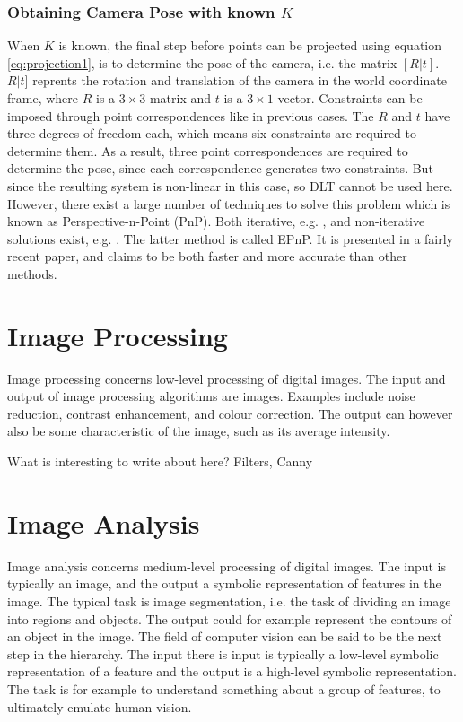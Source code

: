 \subsubsection{Obtaining Camera Pose with known $K$} \label{camera-pose}
When $K$ is known, the final step before points can be projected using equation \ref{eq:projection1}, is to determine the pose of the camera, i.e. the matrix $[R|t]$. $R|t]$ reprents the rotation and translation of the camera in the world coordinate frame, where $R$ is a $3 \times 3$ matrix and $t$ is a $3 \times 1$ vector.
Constraints can be imposed through point correspondences like in previous cases.
The $R$ and $t$ have three degrees of freedom each, which means six constraints are required to determine them.
As a result, three point correspondences are required to determine the pose, since each correspondence generates two constraints.
But since the resulting system is non-linear in this case, so DLT cannot be used here. \cite[187]{hartley-zisserman}
However, there exist a large number of techniques to solve this problem which is known as Perspective-n-Point (PnP).
Both iterative, e.g. \cite{hesch-pnp} \cite{oberkampf-pnp}, and non-iterative solutions exist, e.g. \cite{quan-pnp} \cite{lepetit-pnp}.
The latter method is called EPnP.
It is presented in a fairly recent paper, and claims to be both faster and more accurate than other methods. 

\section{Image Processing}
Image processing concerns low-level processing of digital images. 
The input and output of image processing algorithms are images. 
Examples include noise reduction, contrast enhancement, and colour correction. 
The output can however also be some characteristic of the image, such as its average intensity.\cite[p. 1-2]{pitas}\cite[p. 1-2]{gonzalez-woods}

What is interesting to write about here? Filters, Canny %

\section{Image Analysis}
Image analysis concerns medium-level processing of digital images. The input is typically an image, and the output a symbolic representation of features in the image. The typical task is image segmentation, i.e. the task of dividing an image into regions and objects. The output could for example represent the contours of an object in the image. \cite[p. 1-2]{pitas}\cite[p. 1-2]{gonzalez-woods}
The field of computer vision can be said to be the next step in the hierarchy. 
The input there is input is typically a low-level symbolic representation of a feature and the output is a high-level symbolic representation. 
The task is for example to understand something about a group of features, to ultimately emulate human vision. \cite[p. 1-3]{pitas}\cite[p. 1-3]{gonzalez-woods}

